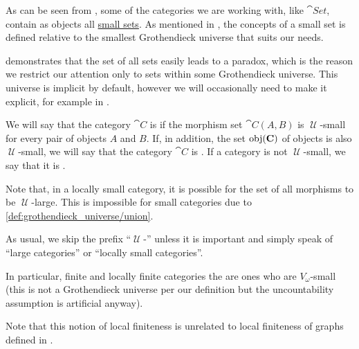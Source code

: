 \begin{definition}\label{def:category_size}
  As can be seen from , some of the categories we are working with, like \( \cat{Set} \), contain as objects all \hyperref[def:large_and_small_sets]{small sets}. As mentioned in , the concepts of a small set is defined relative to the smallest Grothendieck universe that suits our needs.

   demonstrates that the set of all sets easily leads to a paradox, which is the reason we restrict our attention only to sets within some Grothendieck universe. This universe is implicit by default, however we will occasionally need to make it explicit, for example in .

  We will say that the category \( \cat{C} \) is  if the morphism set \( \cat{C}(A, B) \) is \( \mscrU \)-small for every pair of objects \( A \) and \( B \). If, in addition, the set \( \operatorname{obj}(\operatorname{\mathbf{C}}) \) of objects is also \( \mscrU \)-small, we will say that the category \( \cat{C} \) is . If a category is not \( \mscrU \)-small, we say that it is .

  Note that, in a locally small category, it is possible for the set of all morphisms to be \( \mscrU \)-large. This is impossible for small categories due to \ref{def:grothendieck_universe/union}.

  As usual, we skip the prefix \enquote{\( \mscrU \)-} unless it is important and simply speak of \enquote{large categories} or \enquote{locally small categories}.

  In particular, finite and locally finite categories the are ones who are \( V_\omega \)-small (this is not a Grothendieck universe per our definition but the uncountability assumption is artificial anyway).

  Note that this notion of local finiteness is unrelated to local finiteness of graphs defined in .
\end{definition}

